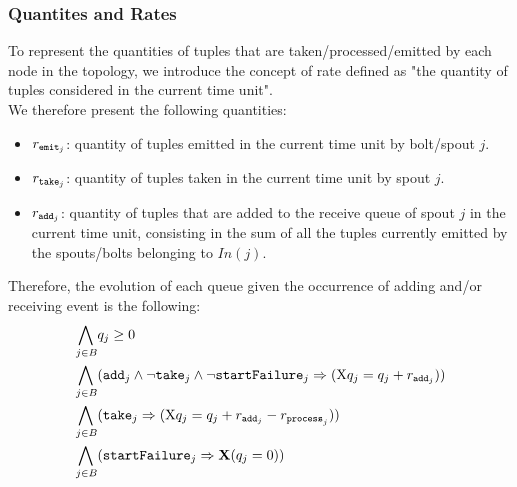 \subsubsection*{Quantites and Rates}
To represent the quantities of tuples that are taken/processed/emitted by each node in the topology, we introduce the concept of rate defined as "the quantity of tuples considered in the current time unit". \\
We therefore present the following quantities:
\begin{itemize}
\item $r_{\mathtt{emit}_{j}}$: quantity of tuples emitted in the current time unit by bolt/spout $j$.
\item $r_{\mathtt{take}_{j}}$: quantity of tuples taken in the current time unit by spout $j$.
\item $r_{\mathtt{add}_{j}}$: quantity of tuples that are added to the receive queue of spout $j$ in the current time unit, consisting in the sum of all the tuples currently emitted by the spouts/bolts belonging to $In(j)$.
\end{itemize}
%
Therefore, the evolution of each queue given the occurrence of adding and/or receiving event is the following:
%
\begin{align*}
\bigwedge_{
\begin{subarray}{c}
\,j \in B
\end{subarray}
} & q_j \geq  0\\ %
%
 \bigwedge_{
\begin{subarray}{c}
\,j \in B
\end{subarray}
} &( \add{j}  \wedge \lnot \ta{j}  \land \lnot \startf{j}
\Rightarrow (\aX q_j = q_j + \ra{j} ))\\ %
%
%
 \bigwedge_{
\begin{subarray}{c}
\,j \in B
\end{subarray}
} &( \ta{j}{}  \Rightarrow (\aX q_j = q_j + \ra{j} - \rp{j} )) \\%
%
%
%
%
%
%
 \bigwedge_{
\begin{subarray}{c}
\,j \in B
\end{subarray}
} &( \startf{j}
\Rightarrow \mathbf{X}( q_j = 0 ))
\end{align*}
